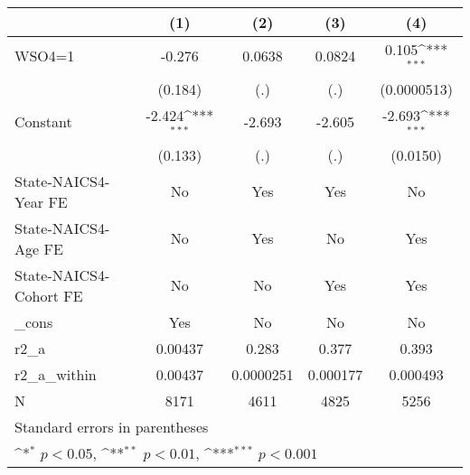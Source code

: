 {
\def\sym#1{\ifmmode^{#1}\else\(^{#1}\)\fi}
\begin{tabular}{l*{4}{c}}
\hline\hline
                    &\multicolumn{1}{c}{(1)}         &\multicolumn{1}{c}{(2)}         &\multicolumn{1}{c}{(3)}         &\multicolumn{1}{c}{(4)}         \\
\hline
WSO4=1              &      -0.276         &      0.0638         &      0.0824         &       0.105\sym{***}\\
                    &     (0.184)         &         (.)         &         (.)         & (0.0000513)         \\
[1em]
Constant            &      -2.424\sym{***}&      -2.693         &      -2.605         &      -2.693\sym{***}\\
                    &     (0.133)         &         (.)         &         (.)         &    (0.0150)         \\
[1em]
State-NAICS4-Year FE&          No         &         Yes         &         Yes         &          No         \\
[1em]
State-NAICS4-Age FE &          No         &         Yes         &          No         &         Yes         \\
[1em]
State-NAICS4-Cohort FE&          No         &          No         &         Yes         &         Yes         \\
[1em]
\_cons              &         Yes         &          No         &          No         &          No         \\
\hline
r2\_a                &     0.00437         &       0.283         &       0.377         &       0.393         \\
r2\_a\_within         &     0.00437         &   0.0000251         &    0.000177         &    0.000493         \\
N                   &        8171         &        4611         &        4825         &        5256         \\
\hline\hline
\multicolumn{5}{l}{\footnotesize Standard errors in parentheses}\\
\multicolumn{5}{l}{\footnotesize \sym{*} \(p<0.05\), \sym{**} \(p<0.01\), \sym{***} \(p<0.001\)}\\
\end{tabular}
}
